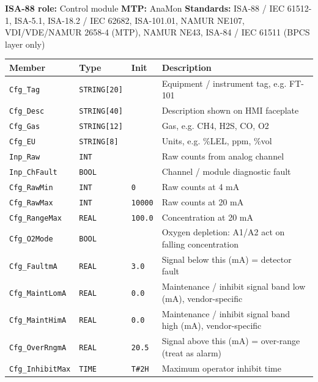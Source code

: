 {\small\textbf{ISA-88 role:} Control module \quad \textbf{MTP:} AnaMon \quad \textbf{Standards:} ISA-88 /\allowbreak{} IEC 61512-1, ISA-5.1, ISA-18.2 /\allowbreak{} IEC 62682, ISA-101.01, NAMUR NE107, VDI/\allowbreak{}VDE/\allowbreak{}NAMUR 2658-4 (MTP), NAMUR NE43, ISA-84 /\allowbreak{} IEC 61511 (BPCS layer only)}
{\footnotesize
\begin{longtable}{@{}>{\raggedright\arraybackslash}p{3.4cm}>{\raggedright\arraybackslash}p{3.3cm}>{\raggedright\arraybackslash}p{1.3cm}>{\raggedright\arraybackslash}p{6.4cm}@{}}
\toprule
\rowcolor{tblhead}\textbf{Member} & \textbf{Type} & \textbf{Init} & \textbf{Description} \\
\midrule
\endhead
\texttt{Cfg\_Tag} & \texttt{STRING[20]} &  & Equipment /\allowbreak{} instrument tag, e.g. FT-101 \\
\texttt{Cfg\_Desc} & \texttt{STRING[40]} &  & Description shown on HMI faceplate \\
\texttt{Cfg\_Gas} & \texttt{STRING[12]} &  & Gas, e.g. CH4, H2S, CO, O2 \\
\texttt{Cfg\_EU} & \texttt{STRING[8]} &  & Units, e.g. \%LEL, ppm, \%vol \\
\texttt{Inp\_Raw} & \texttt{INT} &  & Raw counts from analog channel \\
\texttt{Inp\_ChFault} & \texttt{BOOL} &  & Channel /\allowbreak{} module diagnostic fault \\
\texttt{Cfg\_RawMin} & \texttt{INT} & \texttt{0} & Raw counts at 4 mA \\
\texttt{Cfg\_RawMax} & \texttt{INT} & \texttt{10000} & Raw counts at 20 mA \\
\texttt{Cfg\_RangeMax} & \texttt{REAL} & \texttt{100.0} & Concentration at 20 mA \\
\texttt{Cfg\_O2Mode} & \texttt{BOOL} &  & Oxygen depletion: A1/\allowbreak{}A2 act on falling concentration \\
\texttt{Cfg\_FaultmA} & \texttt{REAL} & \texttt{3.0} & Signal below this (mA) = detector fault \\
\texttt{Cfg\_MaintLomA} & \texttt{REAL} & \texttt{0.0} & Maintenance /\allowbreak{} inhibit signal band low (mA), vendor-specific \\
\texttt{Cfg\_MaintHimA} & \texttt{REAL} & \texttt{0.0} & Maintenance /\allowbreak{} inhibit signal band high (mA), vendor-specific \\
\texttt{Cfg\_OverRngmA} & \texttt{REAL} & \texttt{20.5} & Signal above this (mA) = over-range (treat as alarm) \\
\texttt{Cfg\_InhibitMax} & \texttt{TIME} & \texttt{T\#2H} & Maximum operator inhibit time \\

\end{longtable}}
